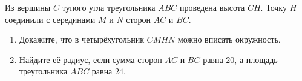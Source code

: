 \begin{ex}
	\begin{condition}
		Из вершины \( C  \) тупого угла треугольника \( ABC  \) проведена высота \( CH \). Точку \( H  \) соединили с серединами \( M \) и \( N \) сторон \( AC  \) и \( BC \).
		\begin{enumerate}
			\item Докажите, что в четырёхугольник \( CMHN  \) можно вписать окружность.
			\item Найдите её радиус, если сумма сторон \( AC  \) и \( BC  \) равна \( 20 \), а площадь треугольника \( ABC  \) равна \( 24 \).
		\end{enumerate}
	\end{condition}
\end{ex}